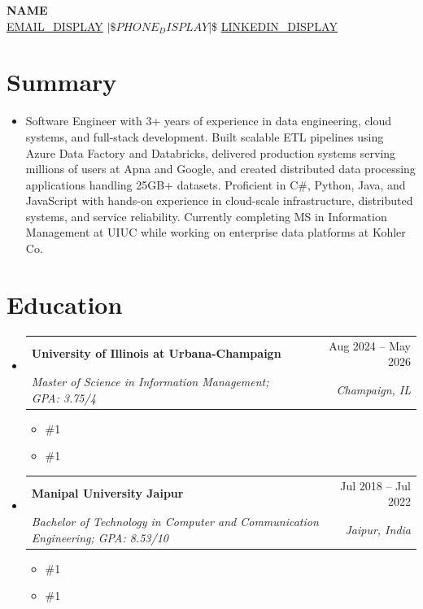 \documentclass[letterpaper,11pt]{article}
\makeatletter
\newcommand{\resumeSubheading}[4]{
  \vspace{0pt}\item
    \begin{tabular*}{\textwidth}{l@{\extracolsep{\fill}}r}
      \textbf{#1} & #2 \\
      \textit{#3} & \textit{#4} \\ 
    \end{tabular*}\vspace{-6pt}
}
\newcommand{\resumeEducationCoursework}[1]{
  \vspace{-9pt} 
  \begin{itemize}[leftmargin=0pt, label={}]
    \item {\#1}
  \end{itemize}
}
\newcommand{\resumeEducationCertifications}[1]{
  \vspace{-15pt} 
  \begin{itemize}[leftmargin=0pt, label={}]
    \item {\#1}
  \end{itemize}
}
\newcommand{\resumeSubHeadingListStart}{\begin{itemize}[leftmargin=0pt,label={},itemsep=-2pt]}
\newcommand{\resumeSubHeadingListEnd}{\end{itemize}}
\makeatother
\begin{document}
\justifying

\begin{center}
    \textbf{\LARGE {{NAME}}} \\ \vspace{5pt}
    \href{mailto:{{EMAIL_URL}}}{{EMAIL_DISPLAY}} $|\$ {{PHONE_DISPLAY}} $|\$ \href{%
      {{LINKEDIN_URL}}%
    }{%
      {{LINKEDIN_DISPLAY}}%
    }
\end{center}

\section{Summary}
\begin{itemize}[leftmargin=0pt, label={}]
  \item { Software Engineer with 3+ years of experience in data engineering, cloud systems, and full-stack development. Built scalable ETL pipelines using Azure Data Factory and Databricks, delivered production systems serving millions of users at Apna and Google, and created distributed data processing applications handling 25GB+ datasets. Proficient in C\#, Python, Java, and JavaScript with hands-on experience in cloud-scale infrastructure, distributed systems, and service reliability. Currently completing MS in Information Management at UIUC while working on enterprise data platforms at Kohler Co. }
\end{itemize}

\section{Education}
  \resumeSubHeadingListStart
    \resumeSubheading
      {University of Illinois at Urbana-Champaign}{Aug 2024 -- May 2026}
      {Master of Science in Information Management; GPA: 3.75/4}{Champaign, IL}
      \resumeEducationCoursework{Relevant Coursework: Applied Machine Learning, Cloud Computing Applications, Data Mining, Data Warehousing and Business Intelligence, Information Modeling, Data Visualization, Data and Statistical Models.}
      \resumeEducationCertifications{Certifications: Getting Started with Microsoft Azure, Cloud Computing, The Complete Prompt Engineering for AI Bootcamp.}

    \resumeSubheading
      {Manipal University Jaipur}{Jul 2018 -- Jul 2022}
      {Bachelor of Technology in Computer and Communication Engineering; GPA: 8.53/10}{Jaipur, India}
      \resumeEducationCoursework{Relevant Coursework: Data Structures and Algorithms, Relational Database Management Systems, Operating Systems, Computer Networks, Software Testing, Cryptography and Security.}
      \resumeEducationCertifications{Certifications: Certified Ethical Hacker (EC Council), Google Project Management Specialization, Networking in Google Cloud, Architecting with Google Kubernetes Engine.}
  \resumeSubHeadingListEnd
\end{document}
